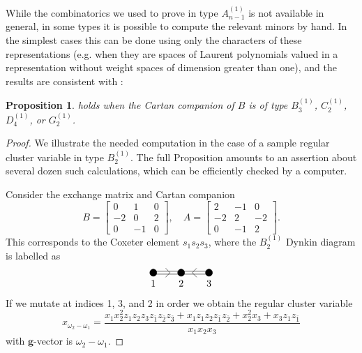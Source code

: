 \documentclass[12pt]{amsart}
\newcommand{\bfg}{\mathbf{g}}
\newcommand{\ol}[1]{\overline{#1}}
\newtheorem{proposition}[theorem]{Proposition}
\theoremstyle{remark}
\numberwithin{equation}{section}
\numberwithin{figure}{section}
\begin{document}
While the combinatorics we used to prove  in type $A_{n-1}^{\!(1)}$ is not available in general, in some types it is possible to compute the relevant minors by hand.
In the simplest cases this can be done using only the characters of these representations (e.g. when they are spaces of Laurent polynomials valued in a representation without weight spaces of dimension greater than one), and the results are consistent with :

\begin{proposition}
   holds when the Cartan companion of $B$ is of type $B_3^{(1)}$, $C_2^{(1)}$, $D_4^{(1)}$, or $G_2^{(1)}$.
\end{proposition}
\begin{proof}
  We illustrate the needed computation in the case of a sample regular cluster variable in type $B_{2}^{(1)}$.
  The full Proposition amounts to an assertion about several dozen such calculations, which can be efficiently checked by a computer.

  Consider the exchange matrix and Cartan companion
  \[
    B = 
    \begin{bmatrix} 
      0 & 1 & 0 \\ 
      -2 & 0 & 2 \\ 
      0 & -1 & 0  
    \end{bmatrix}, 
    \quad 
    A = 
    \begin{bmatrix} 
      2 & -1 & 0 \\ 
      -2 & 2 & -2 \\ 
      0 & -1 & 2  
    \end{bmatrix}.
  \]
  This corresponds to the Coxeter element $s_1 s_2 s_3$, where the $B_2^{(1)}$ Dynkin diagram is labelled as
  \vspace{3mm}
  \[
    \begin{tikzpicture}[scale=0.5]
      \draw (0, 0.1 cm) -- +(2 cm,0);
      \draw (0, -0.1 cm) -- +(2 cm,0);
      \draw[shift={(1.2, 0)}, rotate=0] (135 : 0.45cm) -- (0,0) -- (-135 : 0.45cm);
      {
        \pgftransformxshift{2 cm}
        \draw (0 cm,0) -- (0 cm,0);
        \draw (0 cm, 0.1 cm) -- +(2 cm,0);
        \draw (0 cm, -0.1 cm) -- +(2 cm,0);
        \draw[shift={(0.8, 0)}, rotate=180] (135 : 0.45cm) -- (0,0) -- (-135 : 0.45cm);
        \draw[fill=black] (0 cm, 0 cm) circle (.25cm) node[below=4pt]{$2$};
        \draw[fill=black] (2 cm, 0 cm) circle (.25cm) node[below=4pt]{$3$};
      }
      \draw[fill=black] (0 cm, 0 cm) circle (.25cm) node[below=4pt]{$1$};
    \end{tikzpicture}
  \]
  If we mutate at indices 1, 3, and 2 in order we obtain the regular cluster variable
  \[
    x_{\omega_2 - \omega_1} = \frac{x_1 x_2^2 z_1 z_2 z_3 z_{\ol{1}} z_{\ol{2}} z_{\ol{3}} + x_1 z_1 z_2 z_{\ol{1}} z_{\ol{2}} + x_2^2 x_3 +  x_3 z_1 z_{\ol{1}}}{x_1 x_2 x_3}
  \]
  with $\bfg$-vector is $\omega_2 - \omega_1$.


\end{proof}
\end{document}
